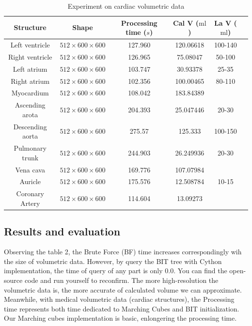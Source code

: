 \documentclass[11pt]{article}
\begin{document}
\begin{multicols}{2}
\begin{table}[]
\begin{tabular}{c|c|c|c|c|c}
    \midrule
    \textbf{Structure} & \textbf{Shape} & \textbf{Processing time ($s$)} & \textbf{Cal V ($\text{ml}$)} & \textbf{La V ($\text{ml}$)} \\ 
    \midrule
    Left ventricle & $512 \times 600 \times 600$ & 127.960 & 120.06618 & 100-140 \\
    Right ventricle & $512 \times 600 \times 600$ & 126.965 & 75.08047 & 50-100 \\
    Left atrium & $512 \times 600 \times 600$ & 103.747 & 30.93378  & 25-35 \\
    Right atrium & $512 \times 600 \times 600$ & 102.356 & 100.00465 & 80-110 \\
    Myocardium & $512 \times 600 \times 600$ &108.042 & 183.84389 & \\
    Ascending arota & $512 \times 600 \times 600$ & 204.393 & 25.047446 & 20-30  \\
    Descending aorta & $512 \times 600 \times 600$ & 275.57 & 125.333 & 100-150 \\
    Pulmonary trunk & $512 \times 600 \times 600$ & 244.903 & 26.249936 & 20-30  \\
    Vena cava & $512 \times 600 \times 600$ & 169.776 & 107.07984  & \\
    Auricle & $512 \times 600 \times 600$ & 175.576 & 12.508784 & 10-15 \\
    Coronary Artery & $512 \times 600 \times 600$ & 114.604 & 13.09273  & \\

    \end{tabular}
    \caption{Experiment on cardiac volumetric data}
    \label{tab:Experiment cardiac display}
\end{table}


\subsection{Results and evaluation}
Observing the table 2, the Brute Force (BF) time increases correspondingly wih the size of volumetric data. However, by query the BIT tree with Cython implementation, the time of query of any part is only $0.0$. You can find the open-source code and run yourself to reconfirm. The more high-resolution the volumetric data is, the more accurate of calculated volume we can approximate. Meanwhile, with medical volumetric data (cardiac structures), the Processing time represents both time dedicated to Marching Cubes and BIT initialization. Our Marching cubes implementation is basic, enlongering the processing time.  
 


\end{multicols}
\end{document}
